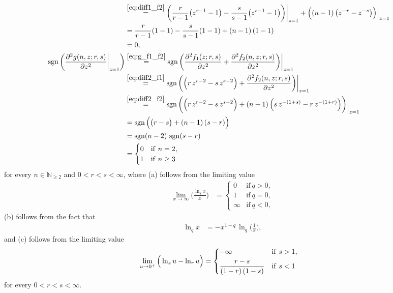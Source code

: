 \documentclass[conference, draftcls, onecolumn]{IEEEtran}
\theoremstyle{plain}
\newcommand{\sgn}{\operatorname{sgn}}
\newcommand{\lemref}[1]{Lemma~\ref{#1}}
\begin{document}
\begin{IEEEproof}[Proof of \lemref{lem:sgn_g}]
\begin{align}
\\
& \overset{\eqref{eq:diff1_f2}}{=}
\bigg( \frac{ r }{ r-1 } \big( z^{r-1} - 1 \big) - \frac{ s }{ s-1 } \big( z^{s-1} - 1 \big) \bigg) \bigg|_{z = 1} + \Big( (n-1) \, \big( z^{-r} - z^{-s} \big) \Big) \Big|_{z = 1}
\\
& =
\frac{ r }{ r-1 } (1 - 1) - \frac{ s }{ s-1 } (1 - 1) + (n-1) \, (1 - 1)
\\
& =
0 ,
\label{eq:sgn_g_diff1_1} \\
\sgn \bigg( \frac{ \partial^{2} g(n, z; r, s) }{ \partial z^{2} } \bigg|_{z = 1} \bigg)
& \overset{\eqref{eq:g_f1_f2}}{=}
\sgn \bigg( \frac{ \partial^{2} f_{1}(z; r, s) }{ \partial z^{2} } + \frac{ \partial^{2} f_{2}(n, z; r, s) }{ \partial z^{2} } \bigg) \bigg|_{z = 1}
\\
& \overset{\eqref{eq:diff2_f1}}{=}
\sgn \bigg( \Big( r \, z^{r-2} - s \, z^{s-2} \Big) + \frac{ \partial^{2} f_{2}(n, z; r, s) }{ \partial z^{2} } \bigg) \bigg|_{z = 1}
\\
& \overset{\eqref{eq:diff2_f2}}{=}
\sgn \bigg( \Big( r \, z^{r-2} - s \, z^{s-2} \Big) + (n-1) \, \Big( s \, z^{-(1+s)} - r \, z^{-(1+r)} \Big) \bigg) \bigg|_{z = 1}
\\
& =
\sgn \Big( \big( r - s \big) + (n-1) \, (s - r) \Big)
\\
& =
\sgn(n-2) \, \sgn(s-r)
\\
& =
\begin{cases}
0
& \mathrm{if} \ n = 2 ,
\\
1
& \mathrm{if} \ n \ge 3
\end{cases}
\label{eq:sgn_g_diff2_1}
\end{align}
for every $n \in \mathbb{N}_{\ge 2}$ and $0 < r < s < \infty$, where (a) follows from the limiting value
\begin{align}
\lim_{x \to \infty} \bigg( \frac{ \ln_{q} x }{ x } \bigg)
& =
\begin{cases}
0
& \mathrm{if} \ q > 0 ,
\\
1
& \mathrm{if} \ q = 0 ,
\\
\infty
& \mathrm{if} \ q < 0 ,
\end{cases}
\end{align}
(b) follows from the fact that
\begin{align}
\ln_{q} x
& =
- x^{1-q} \, \ln_{q} \Big( \frac{1}{x} \Big) ,
\end{align}
and (c) follows from the limiting value
\begin{align}
\lim_{u \to 0^{+}} \Big( \ln_{s} u - \ln_{r} u \Big)
& =
\begin{dcases}
- \infty
& \mathrm{if} \ s > 1 ,
\\
\frac{ r-s }{ (1-r) \, (1-s) }
& \mathrm{if} \ s < 1
\end{dcases}
\end{align}
for every $0 < r < s < \infty$.


\end{IEEEproof}
\end{document}
